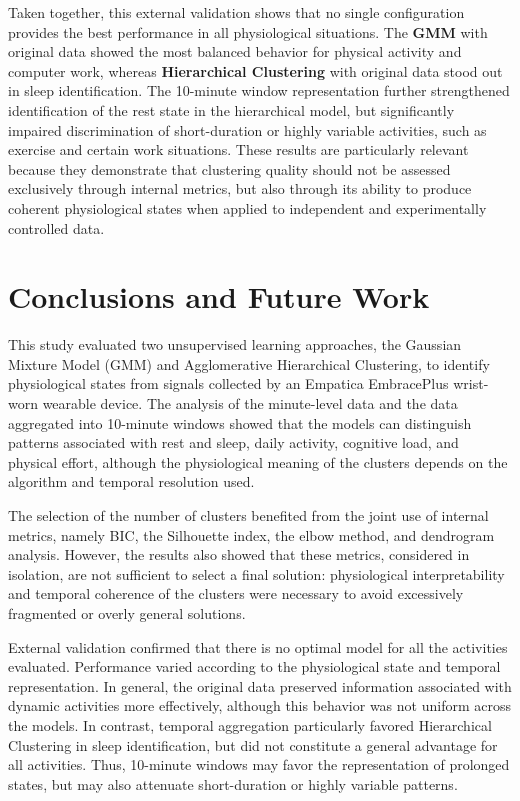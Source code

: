 \documentclass[a4paper,fleqn]{cas-sc}
\begin{document}
Taken together, this external validation shows that no single configuration provides the best performance in all physiological situations. The \textbf{GMM} with original data showed the most balanced behavior for physical activity and computer work, whereas \textbf{Hierarchical Clustering} with original data stood out in sleep identification. The 10-minute window representation further strengthened identification of the rest state in the hierarchical model, but significantly impaired discrimination of short-duration or highly variable activities, such as exercise and certain work situations. These results are particularly relevant because they demonstrate that clustering quality should not be assessed exclusively through internal metrics, but also through its ability to produce coherent physiological states when applied to independent and experimentally controlled data.


\section{Conclusions and Future Work}\label{sec:conclusions}

This study evaluated two unsupervised learning approaches, the Gaussian Mixture Model (GMM) and Agglomerative Hierarchical Clustering, to identify physiological states from signals collected by an Empatica EmbracePlus wrist-worn wearable device. The analysis of the minute-level data and the data aggregated into 10-minute windows showed that the models can distinguish patterns associated with rest and sleep, daily activity, cognitive load, and physical effort, although the physiological meaning of the clusters depends on the algorithm and temporal resolution used.

The selection of the number of clusters benefited from the joint use of internal metrics, namely BIC, the Silhouette index, the elbow method, and dendrogram analysis. However, the results also showed that these metrics, considered in isolation, are not sufficient to select a final solution: physiological interpretability and temporal coherence of the clusters were necessary to avoid excessively fragmented or overly general solutions.

External validation confirmed that there is no optimal model for all the activities evaluated. Performance varied according to the physiological state and temporal representation. In general, the original data preserved information associated with dynamic activities more effectively, although this behavior was not uniform across the models. In contrast, temporal aggregation particularly favored Hierarchical Clustering in sleep identification, but did not constitute a general advantage for all activities. Thus, 10-minute windows may favor the representation of prolonged states, but may also attenuate short-duration or highly variable patterns.
\end{document}
